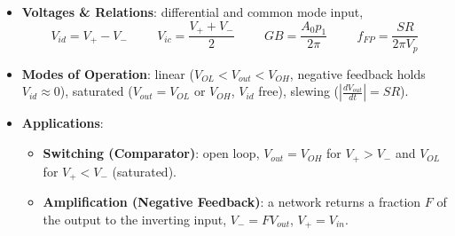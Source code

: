 \begin{itemize}
\begin{itemize}
      \item \textbf{Linear Model} (Small Signal, Frequency Domain, AC Input Analysis (Q4)): single pole, a dominant pole \(p_1\) and DC gain
        \(A_0\),
        \begin{align*}
          A(s) &= \frac{A_0}{1 + \frac{s}{p_1}} = \frac{A_0 p_1}{s + p_1} \\
          A(s) &\approx \frac{A_0 p_1}{s} \hspace{1cm} [|s| \gg p_1] \\
          |A(j\omega_u)| &= \frac{A_0 p_1}{\omega_u} = 1 \hspace{1cm} \Rightarrow \hspace{1cm} \omega_u = A_0 p_1 \\
          GB &= \frac{\omega_u}{2\pi} = A_0 \cdot \frac{p_1}{2\pi} \hspace{1cm} \text{[gain-bandwidth product, Hz]} \\
          A(s) &\approx \frac{2\pi GB}{s} \hspace{1cm} [|s| \gg p_1]
        \end{align*}
        For example, \(A_0 = 10^5\) and \(\frac{p_1}{2\pi} = 10\,\text{Hz}\) give
        \(GB = 10^5 \cdot 10\,\text{Hz} = 1\,\text{MHz}\).
    \end{itemize}
  \item \textbf{Voltages \& Relations}: differential and common mode input,
    \[
      V_{id} = V_+ - V_- \hspace{1cm} V_{ic} = \frac{V_+ + V_-}{2} \hspace{1cm}
      GB = \frac{A_0 p_1}{2\pi} \hspace{1cm} f_{FP} = \frac{SR}{2\pi V_p}
    \]
  \item \textbf{Modes of Operation}: linear (\(V_{OL} < V_{out} < V_{OH}\), negative feedback holds
    \(V_{id} \approx 0\)), saturated (\(V_{out} = V_{OL}\) or \(V_{OH}\), \(V_{id}\) free), slewing (\(\left|\frac{dV_{out}}{dt}\right| = SR\)).
  \item \textbf{Applications}:
    \begin{itemize}
      \item \textbf{Switching (Comparator)}: open loop, \(V_{out} = V_{OH}\) for \(V_+ > V_-\) and \(V_{OL}\)
        for \(V_+ < V_-\) (saturated).
          \item \textbf{Amplification (Negative Feedback)}: a network returns a fraction \(F\) of
        the output to the inverting input, \(V_- = F V_{out}\), \(V_+ = V_{in}\).
        \begin{align*}

\end{align*}
\end{itemize}
\end{itemize}
